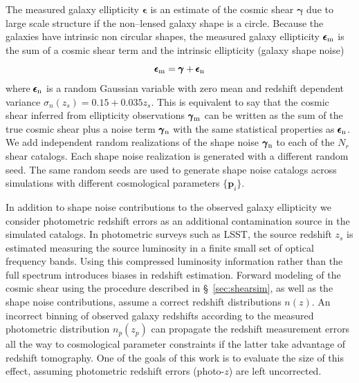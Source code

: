 \documentclass[reprint,aps,prd,superscriptaddress,showkeys,showpacs]{revtex4-1}
\newcommand{\bb}[1]{\mathbf{#1}}
\begin{document}
The measured galaxy ellipticity $\pmb{\epsilon}$ is an estimate of the cosmic shear $\pmb{\gamma}$ due to large scale structure if the non--lensed galaxy shape is a circle. Because the galaxies have intrinsic non circular shapes, the measured galaxy ellipticity $\pmb{\epsilon}_{\rm m}$ is the sum of a cosmic shear term and the intrinsic ellipticity (galaxy shape noise) \citep{wlreview}
\begin{equation}
\pmb{\epsilon}_{\rm m} = \pmb{\gamma} + \pmb{\epsilon}_{\rm n}
\end{equation} 
%
where $\pmb{\epsilon}_{\rm n}$ is a random Gaussian variable with zero mean and redshift dependent variance $\sigma_n(z_s)=0.15+0.035z_s$. This is equivalent to say that the cosmic shear inferred from ellipticity observations $\pmb{\gamma}_{\rm m}$ can be written as the sum of the true cosmic shear plus a noise term $\pmb{\gamma}_{\rm n}$ with the same statistical properties as $\pmb{\epsilon}_{\rm n}$. 
We add independent random realizations of the shape noise $\pmb{\gamma}_{\rm n}$ to each of the $N_r$ shear catalogs. Each shape noise realization is generated with a different random seed. The same random seeds are used to generate shape noise catalogs across simulations with different cosmological parameters $\{\bb{p}_i\}$.

In addition to shape noise contributions to the observed galaxy ellipticity we consider photometric redshift errors as an additional contamination source in the simulated catalogs. In photometric surveys such as LSST, the source redshift $z_s$ is estimated measuring the source luminosity in a finite small set of optical frequency bands. Using this compressed luminosity information rather than the full spectrum introduces biases in redshift estimation. Forward modeling of the cosmic shear using the procedure described in \S~\ref{sec:shearsim}, as well as the shape noise contributions, assume a correct redshift distributions $n(z)$. An incorrect binning of observed galaxy redshifts according to the measured photometric distribution $n_p(z_p)$ can propagate the redshift measurement errors all the way to cosmological parameter constraints if the latter take advantage of redshift tomography. One of the goals of this work is to evaluate the size of this effect, assuming photometric redshift errors (photo-$z$) are left uncorrected. 
\end{document}
